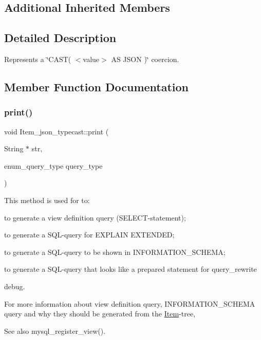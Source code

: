\subsection*{Additional Inherited Members}


\subsection{Detailed Description}
Represents a \char`\"{}\+C\+A\+S\+T( $<$value$>$ A\+S J\+S\+O\+N )\char`\"{} coercion. 

\subsection{Member Function Documentation}
\mbox{\label{classItem__json__typecast_a94def4699135226915f3350f5cb6dde7}} 
\subsubsection{\texorpdfstring{print()}{print()}}
{\footnotesize\ttfamily void Item\+\_\+json\+\_\+typecast\+::print (\begin{DoxyParamCaption}\item[{String $\ast$}]{str,  }\item[{enum\+\_\+query\+\_\+type}]{query\+\_\+type }\end{DoxyParamCaption})\hspace{0.3cm}{\ttfamily [virtual]}}

This method is used for to\+:
\begin{DoxyItemize}
\item to generate a view definition query (S\+E\+L\+E\+CT-\/statement);
\item to generate a S\+QL-\/query for E\+X\+P\+L\+A\+IN E\+X\+T\+E\+N\+D\+ED;
\item to generate a S\+QL-\/query to be shown in I\+N\+F\+O\+R\+M\+A\+T\+I\+O\+N\+\_\+\+S\+C\+H\+E\+MA;
\item to generate a S\+QL-\/query that looks like a prepared statement for query\+\_\+rewrite
\item debug.
\end{DoxyItemize}

For more information about view definition query, I\+N\+F\+O\+R\+M\+A\+T\+I\+O\+N\+\_\+\+S\+C\+H\+E\+MA query and why they should be generated from the \mbox{\hyperlink{classItem}{Item}}-\/tree, \begin{DoxySeeAlso}{See also}
mysql\+\_\+register\+\_\+view(). 
\end{DoxySeeAlso}


